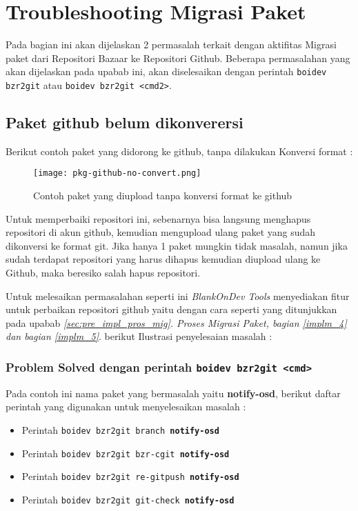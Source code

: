 \pagestyle{fancy}
\fancyhf{}
\fancyhead[LE]{\thepage}
\fancyhead[RO]{\thepage}
\fancyhead[RE]{\nouppercase{\textbf{\leftmark}}}
\setlength{\parindent}{1cm}
\setlength{\parskip}{0.25cm}

\chapter{Troubleshooting Migrasi Paket}
\label{chap:trouble_mig}

Pada bagian ini akan dijelaskan 2 permasalah terkait dengan aktifitas Migrasi paket dari Repositori Bazaar ke Repositori Github. Beberapa permasalahan yang akan dijelaskan pada upabab ini, akan diselesaikan dengan perintah \texttt{boidev bzr2git} atau \texttt{boidev bzr2git <cmd2>}.

\section{Paket github belum dikonverersi}
\label{sec:pkg-github-no-convert}
\noindent
Berikut contoh paket yang didorong ke github, tanpa dilakukan Konversi format :

\begin{figure}[H]
	\centering
	\texttt{[image: pkg-github-no-convert.png]}
	\caption{Contoh paket yang diupload tanpa konversi format ke github}
	\label{fig:bab3_pkg-gihub-no-convert}
\end{figure}

\noindent
Untuk memperbaiki repositori ini, sebenarnya bisa langsung menghapus repositori di akun github, kemudian mengupload ulang paket yang sudah dikonversi ke format git. Jika hanya 1 paket mungkin tidak masalah, namun jika sudah terdapat repositori yang harus dihapus kemudian diupload ulang ke Github, maka beresiko salah hapus repositori. 

\noindent
Untuk melesaikan permasalahan seperti ini \textit{BlankOnDev Tools} menyediakan fitur untuk perbaikan repositori github yaitu dengan cara seperti yang ditunjukkan pada upabab \textit{\ref{sec:pre_impl_pros_mig}. Proses Migrasi Paket, bagian \ref{implm_4} dan bagian \ref{implm_5}}. berikut Ilustrasi penyelesaian masalah :

\subsection{Problem Solved dengan perintah \texttt{boidev bzr2git <cmd>}}
\label{sec:problem-solved1}
\noindent
Pada contoh ini nama paket yang bermasalah yaitu \textbf{notify-osd}, berikut daftar perintah yang digunakan untuk menyelesaikan masalah :
\begin{itemize}
	\item Perintah \texttt{boidev bzr2git branch \textbf{notify-osd}}
	\item Perintah \texttt{boidev bzr2git bzr-cgit \textbf{notify-osd}}
	\item Perintah \texttt{boidev bzr2git re-gitpush \textbf{notify-osd}}
	\item Perintah \texttt{boidev bzr2git git-check \textbf{notify-osd}}
\end{itemize}

